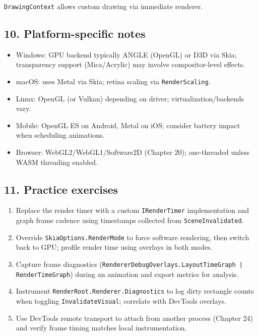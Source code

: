 \passthrough{\lstinline!DrawingContext!} allows custom drawing via
immediate renderer.

\subsection{10. Platform-specific notes}\label{platform-specific-notes}

\begin{itemize}
\tightlist
\item
  Windows: GPU backend typically ANGLE (OpenGL) or D3D via Skia;
  transparency support (Mica/Acrylic) may involve compositor-level
  effects.
\item
  macOS: uses Metal via Skia; retina scaling via
  \passthrough{\lstinline!RenderScaling!}.
\item
  Linux: OpenGL (or Vulkan) depending on driver; virtualization/backends
  vary.
\item
  Mobile: OpenGL ES on Android, Metal on iOS; consider battery impact
  when scheduling animations.
\item
  Browser: WebGL2/WebGL1/Software2D (Chapter 20); one-threaded unless
  WASM threading enabled.
\end{itemize}

\subsection{11. Practice exercises}\label{practice-exercises-16}

\begin{enumerate}
\def\labelenumi{\arabic{enumi}.}
\tightlist
\item
  Replace the render timer with a custom
  \passthrough{\lstinline!IRenderTimer!} implementation and graph frame
  cadence using timestamps collected from
  \passthrough{\lstinline!SceneInvalidated!}.
\item
  Override \passthrough{\lstinline!SkiaOptions.RenderMode!} to force
  software rendering, then switch back to GPU; profile render time using
  overlays in both modes.
\item
  Capture frame diagnostics
  (\passthrough{\lstinline!RendererDebugOverlays.LayoutTimeGraph | RenderTimeGraph!})
  during an animation and export metrics for analysis.
\item
  Instrument \passthrough{\lstinline!RenderRoot.Renderer.Diagnostics!}
  to log dirty rectangle counts when toggling
  \passthrough{\lstinline!InvalidateVisual!}; correlate with DevTools
  overlays.
\item
  Use DevTools remote transport to attach from another process (Chapter
  24) and verify frame timing matches local instrumentation.
\end{enumerate}

